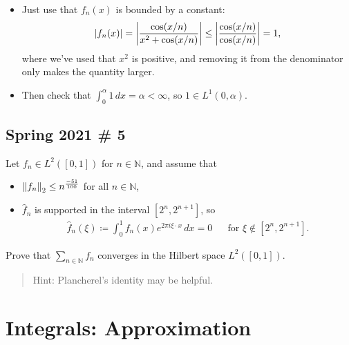 \begin{solution}
\begin{itemize}
  \begin{itemize}
  \tightlist
  \item
    Just use that \(f_n(x)\) is bounded by a constant:
    \begin{align*}
    {\left\lvert {f_n(x)} \right\rvert} 
    = {\left\lvert {\cos(x/n) \over x^2 + \cos(x/n)} \right\rvert}
    \leq {\left\lvert {\cos(x/n) \over \cos(x/n)} \right\rvert} = 1
    ,\end{align*}
    where we've used that \(x^2\) is positive, and removing it from the
    denominator only makes the quantity larger.
  \item
    Then check that \(\int_0^\alpha 1 \,dx= \alpha < \infty\), so
    \(1\in L^1(0, \alpha)\).
  \end{itemize}
\end{itemize}

\end{solution}

\hypertarget{spring-2021-5}{%
\subsection{Spring 2021 \# 5}\label{spring-2021-5}}

Let \(f_n \in L^2([0, 1])\) for \(n\in {\mathbb{N}}\), and assume that

\begin{itemize}
\item
  \({\left\lVert {f_n} \right\rVert}_2 \leq n^{-51 \over 100}\) for all
  \(n\in {\mathbb{N}}\),
\item
  \(\widehat{f}_n\) is supported in the interval \([2^n, 2^{n+1}]\), so
  \begin{align*}
  \widehat{f}_n(\xi) \coloneqq\int_0^1 f_n(x) e^{2\pi i \xi \cdot x} \,dx= 0 && \text{for } \xi \not\in [2^n, 2^{n+1}]
  .\end{align*}
\end{itemize}

Prove that \(\sum_{n\in {\mathbb{N}}} f_n\) converges in the Hilbert
space \(L^2([0, 1])\).

\begin{quote}
Hint: Plancherel's identity may be helpful.
\end{quote}

\hypertarget{integrals-approximation}{%
\section{Integrals: Approximation}\label{integrals-approximation}}

